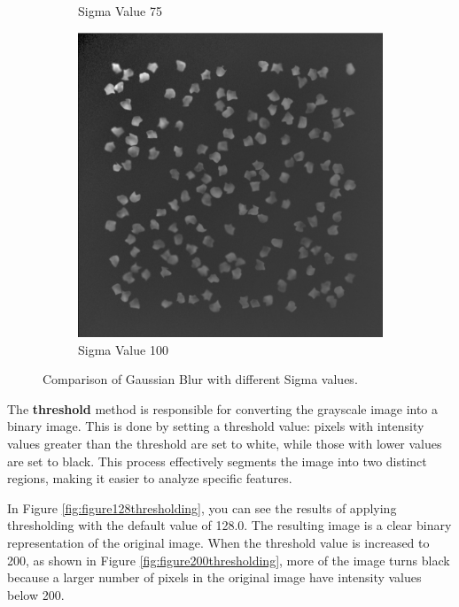 \documentclass[%
	a4paper, %
	12pt, %
	english, %
	bibtotoc %
]{scrartcl}
\begin{document}
\begin{figure}[h!]
\begin{subfigure}{0.3\linewidth}
        \caption{Sigma Value 75}
        \label{fig:figure75gaussianblur}
    \end{subfigure}
    \begin{subfigure}{0.3\linewidth}
        \includegraphics[width=\linewidth]{latex-template-ss24/images/100_Gaussian_blur.png}
        \caption{Sigma Value 100}
        \label{fig:figure100gaussianblur}
    \end{subfigure}
    \caption{Comparison of Gaussian Blur with different Sigma values.}
    \label{fig:gaussian_blur_comparison}
\end{figure}


The \textbf{threshold} method is responsible for converting the grayscale image into a binary image. This is done by setting a threshold value: pixels with intensity values greater than the threshold are set to white, while those with lower values are set to black. This process effectively segments the image into two distinct regions, making it easier to analyze specific features.

In Figure \ref{fig:figure128thresholding}, you can see the results of applying thresholding with the default value of 128.0. The resulting image is a clear binary representation of the original image. When the threshold value is increased to 200, as shown in Figure \ref{fig:figure200thresholding}, more of the image turns black because a larger number of pixels in the original image have intensity values below 200.
\end{document}
